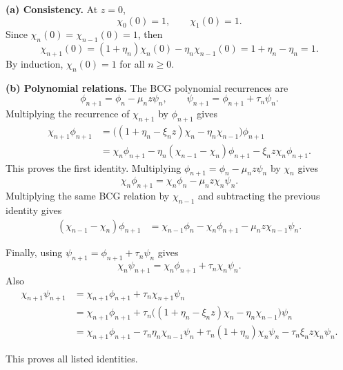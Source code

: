 \documentclass{ctexart}
\begin{document}
\begin{solution}
  \textbf{(a) Consistency.}
  At $z=0$,
  \[
    \chi_0(0)=1,
    \qquad
    \chi_1(0)=1.
  \]
  Since $\chi_n(0)=\chi_{n-1}(0)=1$, then
  \[
    \chi_{n+1}(0)=(1+\eta_n)\chi_n(0)-\eta_n\chi_{n-1}(0)
    =1+\eta_n-\eta_n=1.
  \]
  By induction, $\chi_n(0)=1$ for all $n\ge0$.

  \medskip
  \noindent\textbf{(b) Polynomial relations.}
  The BCG polynomial recurrences are
  \[
    \phi_{n+1}=\phi_n-\mu_n z\psi_n,
    \qquad
    \psi_{n+1}=\phi_{n+1}+\tau_n\psi_n.
  \]
  Multiplying the recurrence of $\chi_{n+1}$ by $\phi_{n+1}$ gives
  \begin{equation}
    \begin{aligned}
      \chi_{n+1}\phi_{n+1}
      &=\bigl((1+\eta_n-\xi_nz)\chi_n-\eta_n\chi_{n-1}\bigr)\phi_{n+1}\\
      &=\chi_n\phi_{n+1}-\eta_n(\chi_{n-1}-\chi_n)\phi_{n+1}
      -\xi_nz\chi_n\phi_{n+1}.
    \end{aligned}
  \end{equation}
  This proves the first identity.  Multiplying $\phi_{n+1}=\phi_n-\mu_nz\psi_n$ by $\chi_n$ gives
  \[
    \chi_n\phi_{n+1}=\chi_n\phi_n-\mu_nz\chi_n\psi_n.
  \]
  Multiplying the same BCG relation by $\chi_{n-1}$ and subtracting the previous identity gives
  \begin{equation}
    \begin{aligned}
      (\chi_{n-1}-\chi_n)\phi_{n+1}
      &=\chi_{n-1}\phi_n-\chi_n\phi_{n+1}-\mu_nz\chi_{n-1}\psi_n.
    \end{aligned}
  \end{equation}

  Finally, using $\psi_{n+1}=\phi_{n+1}+\tau_n\psi_n$ gives
  \[
    \chi_n\psi_{n+1}=\chi_n\phi_{n+1}+\tau_n\chi_n\psi_n.
  \]
  Also
  \begin{equation}
    \begin{aligned}
      \chi_{n+1}\psi_{n+1}
      &=\chi_{n+1}\phi_{n+1}+\tau_n\chi_{n+1}\psi_n\\
      &=\chi_{n+1}\phi_{n+1}
      +\tau_n\bigl((1+\eta_n-\xi_nz)\chi_n-\eta_n\chi_{n-1}\bigr)\psi_n\\
      &=\chi_{n+1}\phi_{n+1}-\tau_n\eta_n\chi_{n-1}\psi_n
      +\tau_n(1+\eta_n)\chi_n\psi_n-\tau_n\xi_nz\chi_n\psi_n.
    \end{aligned}
  \end{equation}

  This proves all listed identities.


\end{solution}
\end{document}
